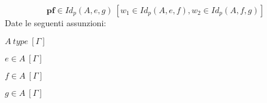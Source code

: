 \begin{displaymath}
    \textbf{pf} \in Id_p(A, e, g)\ [w_1 \in Id_p(A, e, f), w_2 \in Id_p(A, f, g)]
\end{displaymath}
Date le seguenti assunzioni:
\begin{enumerate*}[label=$\pi_{\arabic*}$)]
    \item $A\ type\ [\Gamma]$
    \item $e \in A\ [\Gamma]$
    \item $f \in A\ [\Gamma]$
    \item $g \in A\ [\Gamma]$
\end{enumerate*}